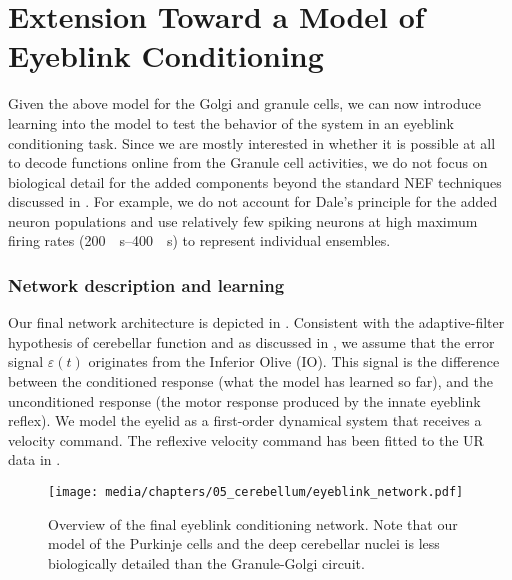 
\section{Extension Toward a Model of Eyeblink Conditioning}

Given the above model for the Golgi and granule cells, we can now introduce learning into the model to test the behavior of the system in an eyeblink conditioning task.
Since we are mostly interested in whether it is possible at all to decode functions online from the Granule cell activities, we do not focus on biological detail for the added components beyond the standard NEF techniques discussed in .
For example, we do not account for Dale's principle for the added neuron populations and use relatively few spiking neurons at high maximum firing rates (\SIrange{200}{400}{\per\second}) to represent individual ensembles.

\subsubsection{Network description and learning}
Our final network architecture is depicted in .
Consistent with the adaptive-filter hypothesis of cerebellar function and as discussed in , we assume that the error signal $\varepsilon(t)$ originates from the Inferior Olive (IO).
This signal is the difference between the conditioned response (what the model has learned so far), and the unconditioned response (the motor response produced by the innate eyeblink reflex).
We model the eyelid as a first-order dynamical system that receives a velocity command.
The reflexive velocity command has been fitted to the UR data in \citet{heiney2014cerebellardependent}.

\begin{figure}
	\centering%
	\texttt{[image: media/chapters/05\_cerebellum/eyeblink\_network.pdf]}
	\caption[Overview of the final eyeblink conditioning network]{Overview of the final eyeblink conditioning network. Note that our model of the Purkinje cells and the deep cerebellar nuclei is less biologically detailed than the Granule-Golgi circuit.
	}
	\label{fig:eyeblink_network}
\end{figure}


